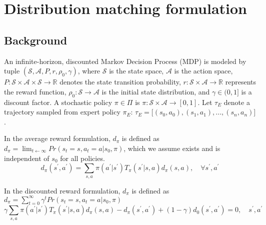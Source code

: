 \section{Distribution matching formulation}

\subsection{Background}
An infinite-horizon, discounted Markov Decision Process (MDP) is modeled by tuple $(\mathcal{S} , \mathcal{A}, P, r , \rho_0, \gamma)$, where $\mathcal{S}$ is the state space, $\mathcal{A}$ is the action space, $P:\mathcal{S}\times\mathcal{A}\times\mathcal{S}\rightarrow \mathbb{R}$ denotes the state transition probability, $r:\mathcal{S}\times\mathcal{A}\rightarrow\mathbb{R}$ represents the reward function, $\rho_0:\mathcal{S} \rightarrow\mathcal{A}$ is the initial state distribution, and $\gamma\in(0, 1]$ is a discount factor. 
A stochastic policy $\pi\in\Pi$ is $\pi: \mathcal{S}\times\mathcal{A}\rightarrow [0, 1]$. Let $\tau_E$ denote a trajectory sampled from expert policy $\pi_E$: $\tau_E = \big[ (s_0, a_0), (s_1, a_1), ..., (s_n, a_n) \big]$. 

In the average reward formulation, $d_\pi$ is defined as $d_{\pi}=\lim_{t\leftarrow\infty}Pr(s_t=s, a_t=a|s_0, \pi)$, which we assume exists and is independent of $s_0$ for all policies. 
\begin{equation}\label{equ:average_reward}
d_{\pi}(s^\prime, a^\prime) = \sum_{s, a} \pi(a^\prime|s^\prime) T_{\pi}(s^\prime|s, a) d_{\pi}(s, a), \quad \forall s^\prime, a^\prime
\end{equation}

In the discounted reward formulation, $d_\pi$ is defined as $d_{\pi}=\sum_{t=0}^{\infty}\gamma^t Pr(s_t=s, a_t=a|s_0, \pi)$
\begin{equation}
\gamma \sum_{s, a}\pi(a^\prime|s^\prime) T_{\pi}(s^\prime |s, a) d_{\pi}(s, a) - d_{\pi}(s^\prime, a^\prime) + (1-\gamma)d_0(s^\prime, a^\prime) = 0, \quad s^\prime, a^\prime
\end{equation}


